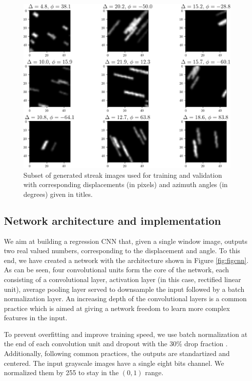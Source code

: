 \documentclass{svjour3}                     %
\begin{document}
\begin{figure}
\includegraphics[width=\textwidth]{figs/figure1.png}
\caption{Subset of generated streak images used for training and validation with corresponding displacements (in pixels) and azimuth angles (in degrees) given in titles.}
\label{fig:fig1}
\end{figure}

\subsection{Network architecture and implementation}

We aim at building a regression CNN that, given a single window image, outputs two real valued numbers, corresponding to the displacement and angle. To this end, we have created a network with the architecture shown in Figure \ref{fig:figcnn}. As can be seen, four convolutional units form the core of the network, each consisting of a convolutional layer, activation layer (in this case, rectified linear unit), average pooling layer served to downsample the input followed by a batch normalization layer. An increasing depth of the convolutional layers is a common practice which is aimed at giving a network freedom to learn more complex features in the input. 

To prevent overfitting and improve training speed, we use batch normalization at the end of each convolution unit \cite{ioffe2015batch} and dropout with the 30\% drop fraction \cite{srivastava2014dropout}. Additionally, following common practices, the outputs are standartized and centered. The input grayscale images have a single eight bits channel. We normalized them by 255 to stay in the $(0, 1)$ range.
\end{document}
